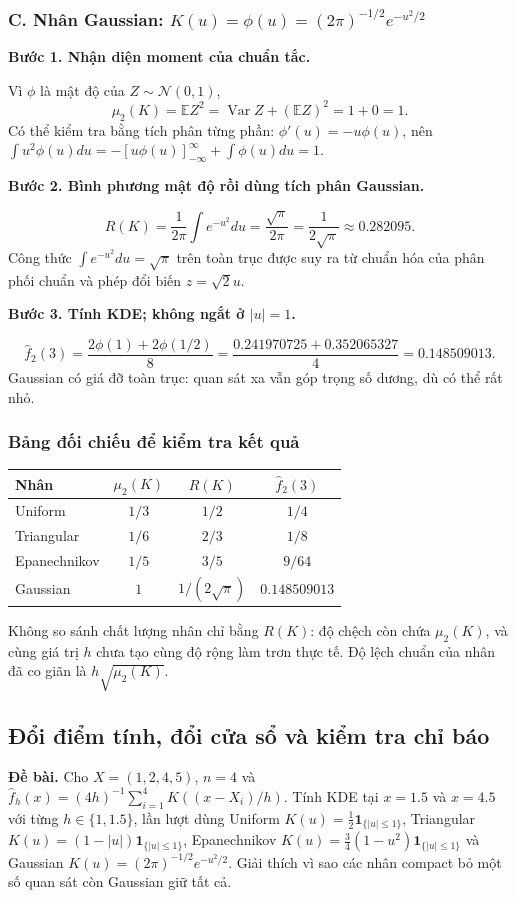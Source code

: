 \documentclass[11pt,a4paper]{article}
\newcommand{\E}{\mathbb E}
\DeclareMathOperator{\Var}{Var}
\newcommand{\buoc}[1]{\par\medskip\textbf{#1}\par}
\begin{document}
\subsubsection*{C. Nhân Gaussian: $K(u)=\phi(u)=(2\pi)^{-1/2}e^{-u^2/2}$}
\buoc{Bước 1. Nhận diện moment của chuẩn tắc.}
Vì $\phi$ là mật độ của $Z\sim\mathcal N(0,1)$,
\[
\mu_2(K)=\E Z^2=\Var Z+(\E Z)^2=1+0=\boxed{1}.
\]
Có thể kiểm tra bằng tích phân từng phần: $\phi'(u)=-u\phi(u)$, nên
$\int u^2\phi(u)du=-[u\phi(u)]_{-\infty}^{\infty}+\int\phi(u)du=1$.
\buoc{Bước 2. Bình phương mật độ rồi dùng tích phân Gaussian.}
\[
R(K)=\frac1{2\pi}\int e^{-u^2}du
=\frac{\sqrt\pi}{2\pi}=\boxed{\frac1{2\sqrt\pi}\approx0.282095}.
\]
Công thức $\int e^{-u^2}du=\sqrt\pi$ trên toàn trục được suy ra từ chuẩn hóa của phân phối chuẩn và phép đổi biến $z=\sqrt2u$.
\buoc{Bước 3. Tính KDE; không ngắt ở $|u|=1$.}
\[
\widehat f_2(3)=\frac{2\phi(1)+2\phi(1/2)}8
=\frac{0.241970725+0.352065327}{4}
=\boxed{0.148509013}.
\]
Gaussian có giá đỡ toàn trục: quan sát xa vẫn góp trọng số dương, dù có thể rất nhỏ.

\subsubsection*{Bảng đối chiếu để kiểm tra kết quả}
\begin{center}
\begin{tabular}{lccc}
\toprule
Nhân & $\mu_2(K)$ & $R(K)$ & $\widehat f_2(3)$\\
\midrule
Uniform & $1/3$ & $1/2$ & $1/4$\\
Triangular & $1/6$ & $2/3$ & $1/8$\\
Epanechnikov & $1/5$ & $3/5$ & $9/64$\\
Gaussian & $1$ & $1/(2\sqrt\pi)$ & $0.148509013$\\
\bottomrule
\end{tabular}
\end{center}
Không so sánh chất lượng nhân chỉ bằng $R(K)$: độ chệch còn chứa $\mu_2(K)$, và cùng giá trị $h$ chưa tạo cùng độ rộng làm trơn thực tế. Độ lệch chuẩn của nhân đã co giãn là $h\sqrt{\mu_2(K)}$.

\subsection{Đổi điểm tính, đổi cửa sổ và kiểm tra chỉ báo}
\textbf{Đề bài.} Cho $X=(1,2,4,5)$, $n=4$ và
$\widehat f_h(x)=(4h)^{-1}\sum_{i=1}^4K((x-X_i)/h)$.
Tính KDE tại $x=1.5$ và $x=4.5$ với từng $h\in\{1,1.5\}$, lần lượt dùng
Uniform $K(u)=\frac12\mathbf1_{\{|u|\leq1\}}$,
Triangular $K(u)=(1-|u|)\mathbf1_{\{|u|\leq1\}}$,
Epanechnikov $K(u)=\frac34(1-u^2)\mathbf1_{\{|u|\leq1\}}$
và Gaussian $K(u)=(2\pi)^{-1/2}e^{-u^2/2}$.
Giải thích vì sao các nhân compact bỏ một số quan sát còn Gaussian giữ tất cả.
\end{document}
